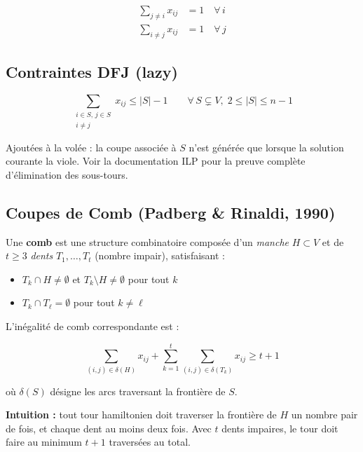 \documentclass[12pt, a4paper]{article}
\begin{document}
\begin{align}
  \sum_{j \neq i} x_{ij} &= 1 \quad \forall\, i \\
  \sum_{i \neq j} x_{ij} &= 1 \quad \forall\, j
\end{align}

\subsection{Contraintes DFJ (lazy)}

\begin{equation}
  \sum_{\substack{i \in S,\, j \in S \\ i \neq j}} x_{ij} \leq |S| - 1
  \qquad \forall\, S \subsetneq V,\; 2 \leq |S| \leq n-1
  \label{eq:dfj}
\end{equation}

Ajoutées à la volée : la coupe associée à $S$ n'est générée que lorsque
la solution courante la viole. Voir la documentation ILP pour la preuve
complète d'élimination des sous-tours.

\subsection{Coupes de Comb (Padberg \& Rinaldi, 1990)}

Une \textbf{comb} est une structure combinatoire composée d'un \emph{manche}
$H \subset V$ et de $t \geq 3$ \emph{dents} $T_1, \ldots, T_t$ (nombre impair),
satisfaisant :

\begin{itemize}
  \item $T_k \cap H \neq \emptyset$ et $T_k \setminus H \neq \emptyset$ pour tout $k$
  \item $T_k \cap T_\ell = \emptyset$ pour tout $k \neq \ell$
\end{itemize}

L'inégalité de comb correspondante est :

\begin{equation}
  \sum_{(i,j) \in \delta(H)} x_{ij}
  + \sum_{k=1}^{t} \sum_{(i,j) \in \delta(T_k)} x_{ij}
  \geq t + 1
  \label{eq:comb}
\end{equation}

où $\delta(S)$ désigne les arcs traversant la frontière de $S$.

\textbf{Intuition :} tout tour hamiltonien doit traverser la frontière de $H$
un nombre pair de fois, et chaque dent au moins deux fois. Avec $t$ dents
impaires, le tour doit faire au minimum $t+1$ traversées au total.
\end{document}
